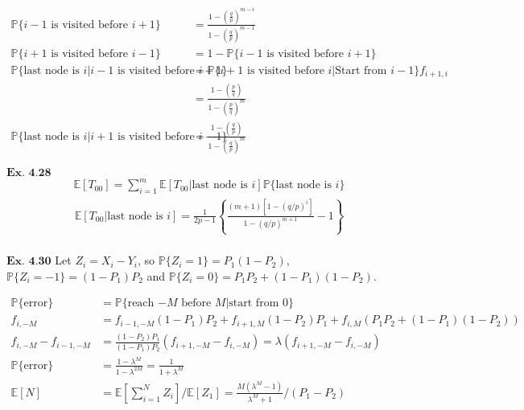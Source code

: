\documentclass{article}
\begin{document}
\begin{align*}
\mathbb{P}\{i-1\text{ is visited before }i+1\} &= \frac{1-\left(\frac{q}{p}\right)^{m-i}}{1-\left(\frac{q}{p}\right)^{m-1}}\\
\mathbb{P}\{i+1\text{ is visited before }i-1\} &= 1 - \mathbb{P}\{i-1\text{ is visited before }i+1\}\\
\mathbb{P}\{\text{last node is }i|i-1\text{ is visited before }i+1\} &= \mathbb{P}\{i+1\text{ is visited before }i|\text{Start from }i-1\}f_{i+1,i}\\
&= \frac{1-\left(\frac{p}{q}\right)}{1-\left(\frac{p}{q}\right)^{m}}\\
\mathbb{P}\{\text{last node is }i|i+1\text{ is visited before }i-1\} &= \frac{1-\left(\frac{q}{p}\right)}{1-\left(\frac{q}{p}\right)^{m}}
\end{align*}

\vspace{0.2in}
${\textbf{Ex. 4.28}}$
\begin{align*}
\mathbb{E}[T_{00}] = \sum_{i=1}^{m}\mathbb{E}[T_{00}|\text{last node is }i]\mathbb{P}\{\text{last node is }i\}
\end{align*}
\begin{align*}
\mathbb{E}[T_{00}|\text{last node is }i] = \frac{1}{2p-1}\left\{\frac{(m+1)[1-(q/p)^i]}{1-(q/p)^{m+1}} - 1\right\}\\
\end{align*}

\vspace{0.2in}
\begin{comment}
${\textbf{Ex. 4.29}}$

\vspace{0.2in}
\end{comment}
${\textbf{Ex. 4.30}}$
Let $Z_i = X_i-Y_i$, so $\mathbb{P}\{Z_i=1\} = P_1(1-P_2)$, $\mathbb{P}\{Z_i=-1\} = (1-P_1)P_2$ and $\mathbb{P}\{Z_i=0\} = P_1P_2 + (1-P_1)(1-P_2)$.

\begin{align*}
\mathbb{P}\{\text{error}\} &= \mathbb{P}\{\text{reach $-M$} \text{ before }M|\text{start from }0\}\\
f_{i,-M} &= f_{i-1,-M}(1-P_1)P_2 + f_{i+1,M}(1-P_2)P_1 + f_{i,M}(P_1P_2 + (1-P_1)(1-P_2))\\
f_{i,-M} -f_{i-1,-M} &= \frac{(1-P_2)P_1}{(1-P_1)P_2}(f_{i+1,-M} - f_{i,-M}) = \lambda (f_{i+1,-M} - f_{i,-M})\\
\mathbb{P}\{\text{error}\} &= \frac{1-\lambda ^{M}}{1-\lambda^{2M}} = \frac{1}{1+\lambda^{M}}\\
\mathbb{E}[N] &= \mathbb{E}\left[\sum_{i=1}^{N}Z_i\right]/\mathbb{E}[Z_1] = \frac{M(\lambda^M-1)}{\lambda^M+1}/(P_1-P_2)
\end{align*}
\end{document}
